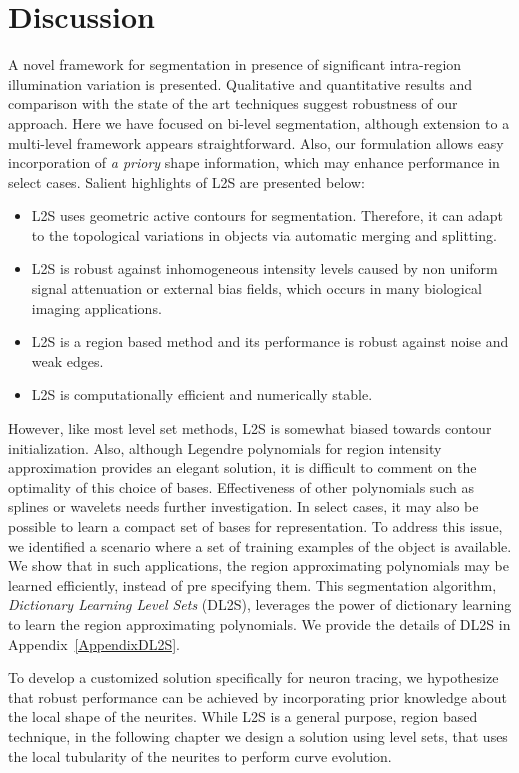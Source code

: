 \section{Discussion}
A novel framework for segmentation in presence of significant intra-region illumination variation is presented. Qualitative and quantitative results and comparison with the state of the art techniques suggest robustness of our approach. Here we have focused on bi-level segmentation, although extension to a multi-level framework appears straightforward. Also, our formulation allows easy incorporation of \textit{a priory} shape information, which may enhance performance in select cases. Salient highlights of L2S are presented below:
\begin{itemize}
\item L2S uses geometric active contours for segmentation. Therefore, it can adapt to the topological variations in objects via automatic merging and splitting.
\item L2S is robust against inhomogeneous intensity levels caused by non uniform signal attenuation or external bias fields, which occurs in many biological imaging applications. 
\item L2S is a region based method and its performance is robust against noise and weak edges.
\item L2S is computationally efficient and numerically stable.
\end{itemize}
However, like most level set methods, L2S is somewhat biased towards contour initialization. 
Also, although Legendre polynomials for region intensity approximation provides an elegant solution, it is difficult to comment on the optimality of this choice of bases. Effectiveness of other polynomials such as splines or wavelets \cite{achuthan2010wavelet} needs further investigation. In select cases, it may also be possible to learn a compact set of bases for representation. To address this issue, we identified a scenario  where a set of training examples of the object is available. We show that in such applications, the region approximating polynomials may be learned efficiently, instead of pre specifying them. This segmentation algorithm, \textit{Dictionary Learning Level Sets} (DL2S)\cite{sarkar_DL2S}, leverages the power of dictionary learning\cite{elad_ksvd} to learn the region approximating polynomials. We provide the details of DL2S in Appendix~\ref{AppendixDL2S}.

To develop a customized solution specifically for neuron tracing, we hypothesize that robust performance can be achieved by incorporating prior knowledge about the local shape of the neurites. While L2S is a general purpose, region based technique, in the following chapter we design a solution using level sets, that uses the local tubularity of the neurites to perform curve evolution.
